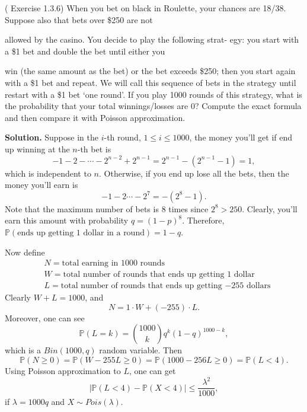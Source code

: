 \begin{eg}[HW5,Q4]
(\cite{IntroPanchenko} Exercise 1.3.6)
When you bet on black in Roulette, your
chances are 18/38. Suppose also that bets over \$250 are not

allowed by the casino. You decide to play the following strat-
egy: you start with a \$1 bet and double the bet until either you

win (the same amount as the bet) or the bet exceeds \$250;
then you start again with a \$1 bet and repeat. We will call
this sequence of bets in the strategy until restart with a \$1
bet ‘one round’. If you play 1000 rounds of this strategy,
what is the probability that your total winnings/losses are
0? Compute the exact formula and then compare it with
Poisson approximation. 
\end{eg}
\textbf{Solution. } Suppose in the $i$-th round, $1\leq i\leq 1000$, the money you'll get if end up winning at the $n$-th bet is
\begin{equation*}
-1-2-\cdots-2^{n-2}+2^{n-1}=2^{n-1}-(2^{n-1}-1)=1,
\end{equation*}
which is independent to $n$. Otherwise, if you end up lose all the bets, then the money you'll earn is
\begin{equation*}
-1-2\cdots-2^7=-(2^8-1).
\end{equation*}
Note that the maximum number of bets is $8$ times since $2^8>250$. Clearly, you'll earn this amount with probability $q=(1-p)^8$. Therefore, $\mathbb{P}(\text{ends up getting $1$ dollar in a round})=1-q.$

Now define
\begin{equation*}
\begin{aligned}
&N=\text{total earning in $1000$ rounds} \\& 
W =\text{total number of rounds that ends up getting $1$ dollar} \\&
L =\text{total number of rounds that ends up getting $-255$ dollars}
\end{aligned}
\end{equation*}
Clearly $W+L=1000$, and
\begin{equation*}
N = 1\cdot W+(-255)\cdot L.
\end{equation*}
Moreover, one can see
\begin{equation*}
\mathbb{P}(L=k)=\binom{1000}{k}q^k(1-q)^{1000-k},
\end{equation*}
which is a $Bin(1000,q)$ random variable. Then
\begin{equation*}
\mathbb{P}(N\geq 0)=\mathbb{P}(W-255L\geq 0)=\mathbb{P}(1000-256L\geq 0)=\mathbb{P}(L<4).
\end{equation*}
Using Poisson approximation to $L$, one can get
\begin{equation*}
\big|\mathbb{P}(L<4)-\mathbb{P}(X<4)\big|\leq\frac{\lambda^2}{1000},
\end{equation*}
if $\lambda = 1000q$ and $X\sim Pois(\lambda)$.


